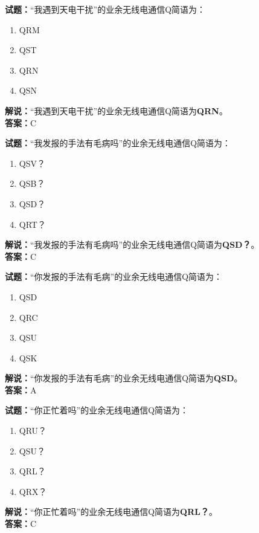 \documentclass{ctexbook}
\begin{document}
\bigskip


\noindent\textbf{试题：}“我遇到天电干扰”的业余无线电通信Q简语为：
\begin{enumerate}[leftmargin=3em]
\item QRM
\item QST
\item QRN
\item QSN
\end{enumerate}
\noindent\textbf{解说：}“我遇到天电干扰”的业余无线电通信Q简语为\textbf{QRN}。\\\noindent\textbf{答案：}C



\bigskip


\noindent\textbf{试题：}“我发报的手法有毛病吗”的业余无线电通信Q简语为：
\begin{enumerate}[leftmargin=3em]
\item QSV？
\item QSB？
\item QSD？
\item QRT？
\end{enumerate}
\noindent\textbf{解说：}“我发报的手法有毛病吗”的业余无线电通信Q简语为\textbf{QSD？}。\\\noindent\textbf{答案：}C




\bigskip


\noindent\textbf{试题：}“你发报的手法有毛病”的业余无线电通信Q简语为：
\begin{enumerate}[leftmargin=3em]
\item QSD
\item QRC
\item QSU
\item QSK
\end{enumerate}
\noindent\textbf{解说：}“你发报的手法有毛病”的业余无线电通信Q简语为\textbf{QSD}。\\\noindent\textbf{答案：}A



\bigskip


\noindent\textbf{试题：}“你正忙着吗”的业余无线电通信Q简语为：
\begin{enumerate}[leftmargin=3em]
\item QRU？
\item QSU？
\item QRL？
\item QRX？
\end{enumerate}
\noindent\textbf{解说：}“你正忙着吗”的业余无线电通信Q简语为\textbf{QRL？}。\\\noindent\textbf{答案：}C
\end{document}
